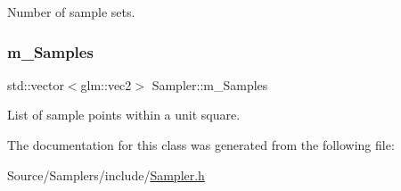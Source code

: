 Number of sample sets. \hypertarget{class_sampler_adbc476f6d58621c0ce9173bbe1c53d70}{}\label{class_sampler_adbc476f6d58621c0ce9173bbe1c53d70} 
\subsubsection{\texorpdfstring{m\+\_\+\+Samples}{m\_Samples}}
{\footnotesize\ttfamily std\+::vector$<$glm\+::vec2$>$ Sampler\+::m\+\_\+\+Samples\hspace{0.3cm}{\ttfamily [protected]}}

List of sample points within a unit square. 

The documentation for this class was generated from the following file\+:\begin{DoxyCompactItemize}
\item 
Source/\+Samplers/include/\hyperlink{_sampler_8h}{Sampler.\+h}\end{DoxyCompactItemize}
